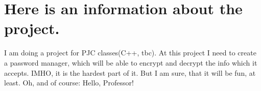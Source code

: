 \chapter{Here is an information about the project.}
\hypertarget{index}{}\label{index}
I am doing a project for PJC classes(C++, tbc). At this project I need to create a password manager, which will be able to encrypt and decrypt the info which it accepts. IMHO, it is the hardest part of it. But I am sure, that it will be fun, at least. Oh, and of course\+: Hello, Professor! 